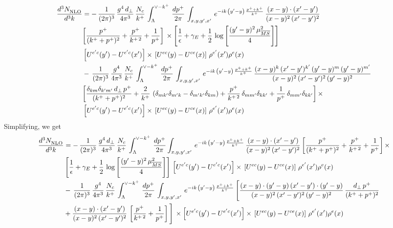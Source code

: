 \begin{align}
     \frac{d^{3}N_{\rm NLO}^{\rm}}{d^{3}k}  & = -\,\frac{1}{(2\pi)^{3}}\,\frac{g^{4}\,d_{\perp}}{4\pi^{3}}\,\frac{N_{c}}{k^{+}}\,\int_{\Lambda}^{\vee-k^{+}}\, \frac{dp^{+}}{2\pi}\,\int_{x,y,y^{\prime},x'}\,e^{-ik\,\left(y'-y\right)\,\frac{p^{+}+k^{+}}{k^{+}}}\,\frac{(x-y)\cdot (x'-y')}{(x-y)^{2}\,(x'-y')^{2}}\notag \\ &  \bigg[\frac{p^{+}}{(k^{+}+p^{+})^{2}} + \frac{p^{+}}{k^{+\,2}}+\frac{1}{p^{+}}\bigg]\,\times\left[\frac{1}{\epsilon} +\gamma_{E} +\frac{1}{2}\,\log{\left[\frac{(y'-y)^{2}\,\mu^{2}_{\overline{MS}}}{4}\right]}\right]\notag \\ &  \left[U^{e'c}(y') - U^{e'c}(x')\right] \times\, \left[U^{ec}(y) - U^{ce}(x)\right]\, \rho^{e'}(x') \rho^{e}(x)\notag \\ & -\,\frac{1}{(2\pi)^{3}}\,\frac{g^{4}}{4\pi^{3}}\,\frac{N_{c}}{k^{+}}\,\int_{\Lambda}^{\vee-k^{+}}\, \frac{dp^{+}}{2\pi}\,\int_{x,y,y^{\prime},x'}\,e^{-ik\,\left(y'-y\right)\,\frac{p^{+}+k^{+}}{k^{+}}}\,\frac{(x-y)^{k}\,(x'-y')^{k'}\,(y'-y)^{m}\,(y'-y)^{m'}}{(x-y)^{2}\,(x'-y')^{2}\,(y'-y)^{2}}\notag \\ &  \bigg[\frac{\delta_{km}\delta_{k'm'}\,d_{\perp}\,p^{+}}{(k^{+}+p^{+})^{2}}+\frac{2}{k^{+}}\,\left(\delta_{mk'}\delta_{m'k}-\delta_{m'k'}\delta_{km}\right) + \frac{p^{+}}{k^{+\,2}}\,\delta_{mm'}\delta_{kk'}+\frac{1}{p^{+}}\,\delta_{mm'}\delta_{kk'}\bigg]\,\times\notag \\ &  \left[U^{e'c}(y') - U^{e'c}(x')\right] \times\, \left[U^{ec}(y) - U^{ce}(x)\right]\, \rho^{e'}(x') \rho^{e}(x)
\end{align}
Simplifying, we get
\begin{align}
     \frac{d^{3}N_{\rm NLO}^{\rm}}{d^{3}k}  & = -\,\frac{1}{(2\pi)^{3}}\,\frac{g^{4}\,d_{\perp}}{4\pi^{3}}\,\frac{N_{c}}{k^{+}}\,\int_{\Lambda}^{\vee-k^{+}}\, \frac{dp^{+}}{2\pi}\int_{x,y,y^{\prime},x'}\,e^{-ik\,\left(y'-y\right)\,\frac{p^{+}+k^{+}}{k^{+}}}\,\frac{(x-y)\cdot (x'-y')}{(x-y)^{2}\,(x'-y')^{2}}\,\bigg[\frac{p^{+}}{(k^{+}+p^{+})^{2}} + \frac{p^{+}}{k^{+\,2}}+\frac{1}{p^{+}}\bigg]\,\times\notag \\ & \left[\frac{1}{\epsilon} +\gamma_{E} +\frac{1}{2}\,\log{\left[\frac{(y'-y)^{2}\,\mu^{2}_{\overline{MS}}}{4}\right]}\right]\,\left[U^{e'c}(y') - U^{e'c}(x')\right] \times\, \left[U^{ec}(y) - U^{ce}(x)\right]\, \rho^{e'}(x') \rho^{e}(x)\notag \\ & -\,\frac{1}{(2\pi)^{3}}\,\frac{g^{4}}{4\pi^{3}}\,\frac{N_{c}}{k^{+}}\,\int_{\Lambda}^{\vee-k^{+}}\, \frac{dp^{+}}{2\pi}\,\int_{x,y,y^{\prime},x'}\,e^{-ik\,\left(y'-y\right)\,\frac{p^{+}+k^{+}}{k^{+}}}\,\Bigg[\frac{(x-y)\cdot (y'-y)\, (x'-y')\cdot (y'-y)}{(x-y)^{2}\,(x'-y')^{2}\,(y'-y)^{2}}\,\frac{d_{\perp}\,p^{+}}{(k^{+}+p^{+})^{2}}\notag \\ & + \frac{(x-y)\cdot (x'-y')}{(x-y)^{2}\,(x'-y')^{2}}\,\left[\frac{p^{+}}{k^{+\,2}} + \frac{1}{p^{+}}\right]\Bigg]\,\times \left[U^{e'c}(y') - U^{e'c}(x')\right] \times\, \left[U^{ec}(y) - U^{ce}(x)\right]\, \rho^{e'}(x') \rho^{e}(x)
\end{align}
